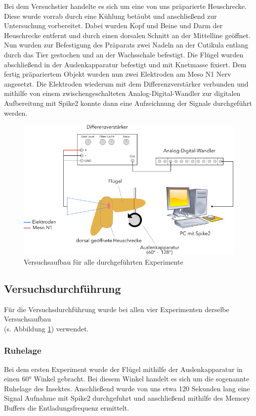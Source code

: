 \documentclass[a4paper]{article}
\begin{document}
\noindent Bei dem Versuchstier handelte es sich um eine von uns präparierte Heuschrecke. Diese wurde vorrab durch eine Kühlung betäubt und anschließend zur Untersuchung vorbereitet. Dabei wurden Kopf und Beine und Darm der Heuschrecke entfernt und durch einen dorsalen Schnitt an der Mittelline geöffnet. Nun wurden zur Befestigung des Präparats zwei Nadeln an der Cutikula entlang durch das Tier gestochen und an der Wachsschale befestigt. Die Flügel wurden abschließend in der Auslenkapparatur befestigt und mit Knetmasse fixiert. Dem fertig präpariertem Objekt wurden nun zwei Elektroden am Meso N1 Nerv angesetzt. Die Elektroden wiederum mit dem Differenzverstärker verbunden und mithilfe von einem zwischengeschalteten Analog-Digital-Wandler zur digitalen Aufbereitung mit Spike2 konnte dann eine Aufzeichnung der Signale durchgeführt werden.

\begin{figure}[H]
    \centering
    \includegraphics[scale=0.5]{images/Versuchsaufbau__Heuschrecke.png}
    \caption{Versuchsaufbau für alle durchgeführten Experimente}
    \label{fig:Versuchsaufbau}
\end{figure}

\subsection{Versuchsdurchführung}

Für die Versuchsdurchführung wurde bei allen vier Experimenten derselbe Versuchsaufbau  \\ (s. Abbildung  \ref{fig:Versuchsaufbau}) verwendet. 

\subsubsection{Ruhelage}
Bei dem ersten Experiment wurde der Flügel mithilfe der Auslenkapparatur in einen \ang{60} Winkel gebracht. Bei diesem Winkel handelt es sich um die sogenannte Ruhelage des Insektes. Anschließend wurde von uns etwa 120 Sekunden lang eine Signal Aufnahme mit Spike2 durchgefuhrt und anschließend mithilfe des Memory Buffers die Entladungsfrequenz ermittelt.  
\end{document}
